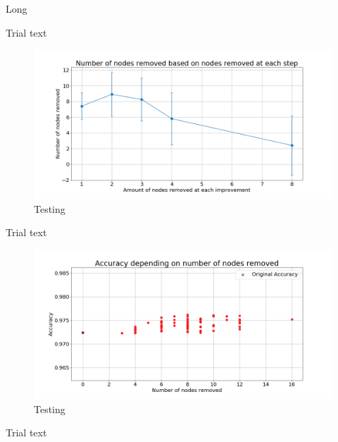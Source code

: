 \documentclass[UKenglish]{ifimaster}
\begin{document}
            \begin{table}[h!]
                \centering
                \resizebox{\textwidth}{!}{}
                \caption[Short]{Long}
                \label{tab:nr_rnd_rem_imp_mnist}
            \end{table}

            Trial text

            \begin{figure}[h!]\centering
                \includegraphics[width=\textwidth]{Num_rem_vs_size_removed_mnist.png}
                \caption[Short title]{Testing}
                \label{fig:num_rem_rn_imp_mnist}
            \end{figure}

            Trial text

            \begin{figure}[h!]\centering
                \includegraphics[width=\textwidth]{Accuracy_vs_nodes_removed_mnist.png}
                \caption[Short title]{Testing}
                \label{fig:acc_rn_imp_mnist}
            \end{figure}

            Trial text
\end{document}
